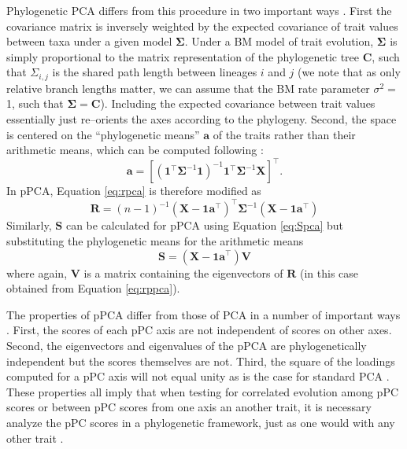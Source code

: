 \documentclass[a4paper,12pt]{article}
\begin{document}
Phylogenetic PCA differs from this procedure in two important ways \citep{Revell2008,Polly2013} . First the covariance matrix is inversely weighted by the expected covariance of trait values between taxa under a given model $\mathbf{\Sigma}$. Under a BM model of trait evolution, $\mathbf{\Sigma}$ is simply proportional to the matrix representation of the phylogenetic tree $\mathbf{C}$, such that $\Sigma_{i,j}$ is the shared path length between lineages $i$ and $j$ (we note that as only relative branch lengths matter, we can assume that the BM rate parameter $\sigma^2=$ 1, such that $\mathbf{\Sigma}=\mathbf{C}$). Including the expected covariance between trait values essentially just re--orients the axes according to the phylogeny. Second, the space is centered on the ``phylogenetic means'' $\mathbf{a}$ of the traits rather than their arithmetic means, which can be computed following \citet{RevellHarmon2008}:
\begin{equation}\label{eq:phymean}
\mathbf{a}=[(\mathbf{1}^\intercal \mathbf{\Sigma}^{-1} \mathbf{1})^{-1} 
\mathbf{1}^\intercal \mathbf{\Sigma}^{-1} \mathbf{X}]^\intercal.
\end{equation}
In pPCA, Equation \ref{eq:rpca} is therefore modified as
\begin{equation}\label{eq:rppca}
\mathbf{R} = (n-1)^{-1}(\mathbf{X} - \mathbf{1a}^\intercal)^\intercal \mathbf{\Sigma}^{-1} (\mathbf{X} - \mathbf{1a}^\intercal)
\end{equation}
Similarly, $\mathbf{S}$ can be calculated for pPCA using Equation \ref{eq:Spca} but substituting the phylogenetic means for the arithmetic means
\begin{equation}\label{eq:Sppca}
\mathbf{S}=(\mathbf{X} - \mathbf{1a}^\intercal)\mathbf{V}
\end{equation}
where again, $\mathbf{V}$ is a matrix containing the eigenvectors of $\mathbf{R}$ (in this case obtained from Equation \ref{eq:rppca}).

The properties of pPCA differ from those of PCA in a number of important ways \citep{Revell2008, Polly2013}. First, the scores of each pPC axis are not independent of scores on other axes. Second, the eigenvectors and eigenvalues of the pPCA are phylogenetically independent but the scores themselves are not. Third, the square of the loadings computed for a pPC axis will not equal unity as is the case for standard PCA  \citep[see][for details on how these loadings are calculated]{Revell2008}. These properties all imply that when testing for correlated evolution among pPC scores or between pPC scores from one axis an another trait, it is necessary analyze the pPC scores in a phylogenetic framework, just as one would with any other trait \citep{Revell2008, Polly2013}. 
\end{document}
